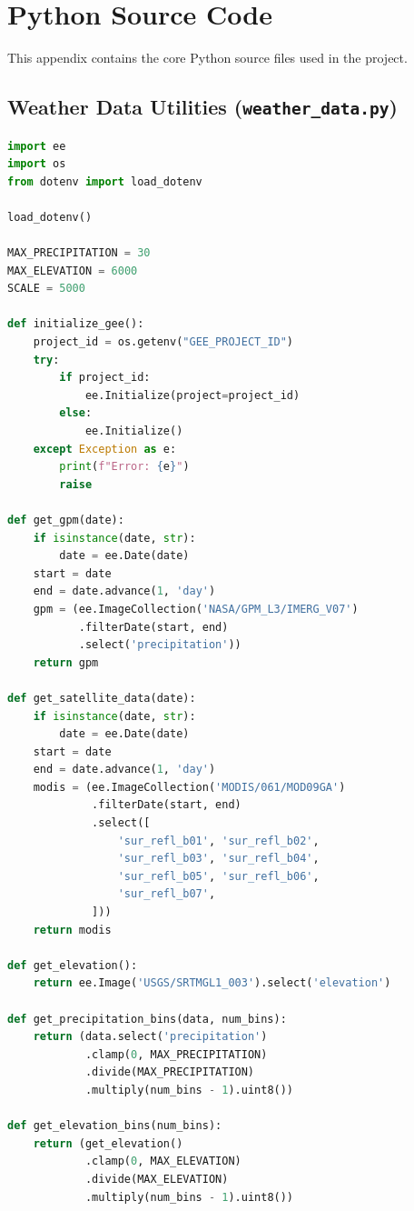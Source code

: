 \documentclass[12pt, a4paper]{report}
\begin{document}
\appendix

\chapter{Python Source Code}
\label{app:python_code}

This appendix contains the core Python source files used in the project.

\section*{Weather Data Utilities (\texttt{weather\_data.py})}

\begin{lstlisting}[language=Python, caption=Functions for GEE initialization and satellite data retrieval.]
import ee
import os
from dotenv import load_dotenv

load_dotenv()

MAX_PRECIPITATION = 30
MAX_ELEVATION = 6000
SCALE = 5000

def initialize_gee():
    project_id = os.getenv("GEE_PROJECT_ID")
    try:
        if project_id:
            ee.Initialize(project=project_id)
        else:
            ee.Initialize()
    except Exception as e:
        print(f"Error: {e}")
        raise

def get_gpm(date):
    if isinstance(date, str):
        date = ee.Date(date)
    start = date
    end = date.advance(1, 'day')
    gpm = (ee.ImageCollection('NASA/GPM_L3/IMERG_V07')
           .filterDate(start, end)
           .select('precipitation'))
    return gpm

def get_satellite_data(date):
    if isinstance(date, str):
        date = ee.Date(date)
    start = date
    end = date.advance(1, 'day')
    modis = (ee.ImageCollection('MODIS/061/MOD09GA')
             .filterDate(start, end)
             .select([
                 'sur_refl_b01', 'sur_refl_b02',
                 'sur_refl_b03', 'sur_refl_b04',
                 'sur_refl_b05', 'sur_refl_b06',
                 'sur_refl_b07',
             ]))
    return modis

def get_elevation():
    return ee.Image('USGS/SRTMGL1_003').select('elevation')

def get_precipitation_bins(data, num_bins):
    return (data.select('precipitation')
            .clamp(0, MAX_PRECIPITATION)
            .divide(MAX_PRECIPITATION)
            .multiply(num_bins - 1).uint8())

def get_elevation_bins(num_bins):
    return (get_elevation()
            .clamp(0, MAX_ELEVATION)
            .divide(MAX_ELEVATION)
            .multiply(num_bins - 1).uint8())
\end{lstlisting}
\end{document}
